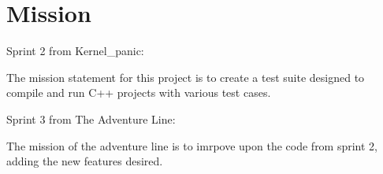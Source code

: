 
\chapter{Mission}

Sprint 2 from Kernel\_panic:

The mission statement for this project is to create a test suite designed to compile and run C++ projects with various test cases.

Sprint 3 from The Adventure Line:

The mission of the adventure line is to imrpove upon the code from sprint 2, adding the new features desired.